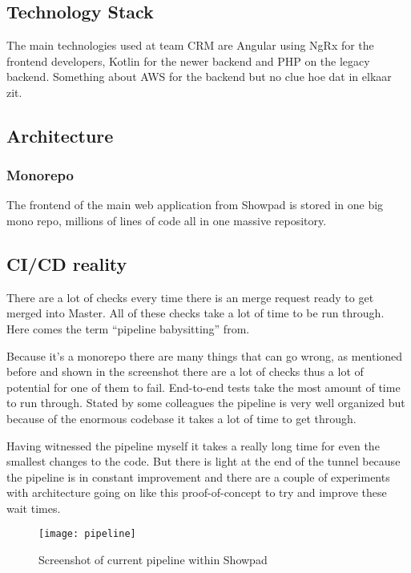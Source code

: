 \chapter{}
\label{ch:baseline}
\section{Technology Stack}
The main technologies used at team CRM are Angular using NgRx for the frontend developers, Kotlin for the newer backend and PHP on the legacy backend. Something about AWS for the backend but no clue hoe dat in elkaar zit.

\section{Architecture}
\subsection{Monorepo}
The frontend of the main web application from Showpad is stored in one big mono repo,
millions of lines of code all in one massive repository.
\section{CI/CD reality}
There are a lot of checks every time there is an merge request ready to get merged into Master.
All of these checks take a lot of time to be run through. Here comes the term “pipeline babysitting” from.

Because it’s a monorepo there are many things that can go wrong, as mentioned before and shown in the screenshot there are a lot of checks thus a lot of potential for one of them to fail. End-to-end tests take the most amount of time to run through. Stated by some colleagues the pipeline is very well organized but because of the enormous codebase it takes a lot of time to get through.

Having witnessed the pipeline myself it takes a really long time for even the smallest changes to the code. But there is light at the end of the tunnel because the pipeline is in constant improvement and there are a couple of experiments with architecture going on like this proof-of-concept to try and improve these wait times.

\begin{figure}[!h]
    \centering
    \texttt{[image: pipeline]}
    \caption{Screenshot of current pipeline within Showpad}
\end{figure}

